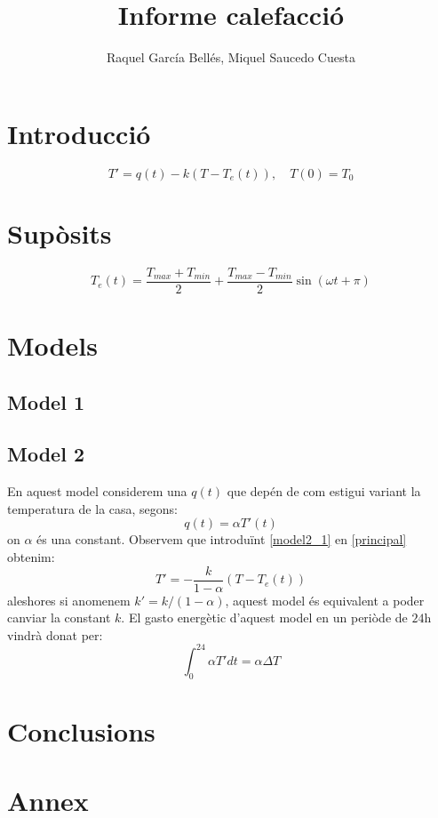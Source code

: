\documentclass[12pt]{article}
\title{\sffamily {\bfseries EDIM I:} Informe calefacció}
\author{\sffamily Raquel García Bellés, Miquel Saucedo Cuesta}
\date{}
\begin{document}
	
\maketitle
\section*{Introducció}
\begin{equation}\label{principal}
	T'=q(t)-k(T-T_e(t)),\quad T(0)=T_0
\end{equation}
\section*{Supòsits}
\begin{equation}\label{te}
	T_e(t)=\frac{T_{max}+T_{min}}{2}+\frac{T_{max}-T_{min}}{2}\sin\left(\omega t+\pi\right)
\end{equation}
\section*{Models}
	\subsection{Model 1}
	\subsection{Model 2}
	En aquest model considerem una $q(t)$ que depén de com estigui variant la temperatura de la casa, segons:
	\begin{equation}\label{model2_1}
		q(t)=\alpha T'(t)
	\end{equation}
	on $\alpha$ és una constant. Observem que introduïnt \eqref{model2_1} en \eqref{principal} obtenim:
	\begin{equation}
		T'=-\frac{k}{1-\alpha}(T-T_e(t))
	\end{equation}
	aleshores si anomenem $k'=k/(1-\alpha)$, aquest model és equivalent a poder canviar la constant $k$.
	El gasto energètic d'aquest model en un periòde de $24$h vindrà donat per:
	\begin{equation}
		\int_{0}^{24}\alpha T'dt=\alpha\Delta T
	\end{equation}
\section*{Conclusions}
\section*{Annex}
\end{document}
